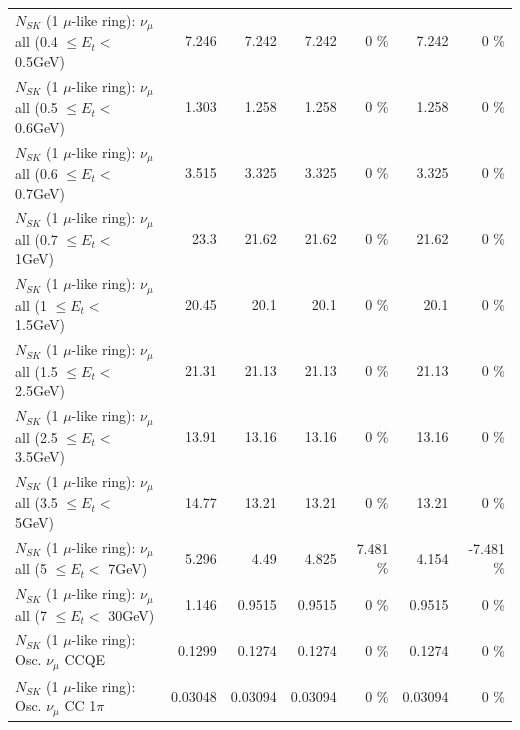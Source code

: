 \begin{table}
\begin{tabular}{| l | r | r | r  r | r  r |}
       $N_{SK}$ (1 $\mu$-like ring): $\nu_{\mu}$ all (0.4 $\leq E_{t} <$ 0.5GeV) &           7.246 &           7.242 &           7.242 &        0 \%  &           7.242 &        0 \%  \\ 
       $N_{SK}$ (1 $\mu$-like ring): $\nu_{\mu}$ all (0.5 $\leq E_{t} <$ 0.6GeV) &           1.303 &           1.258 &           1.258 &        0 \%  &           1.258 &        0 \%  \\ 
       $N_{SK}$ (1 $\mu$-like ring): $\nu_{\mu}$ all (0.6 $\leq E_{t} <$ 0.7GeV) &           3.515 &           3.325 &           3.325 &        0 \%  &           3.325 &        0 \%  \\ 
         $N_{SK}$ (1 $\mu$-like ring): $\nu_{\mu}$ all (0.7 $\leq E_{t} <$ 1GeV) &            23.3 &           21.62 &           21.62 &        0 \%  &           21.62 &        0 \%  \\ 
         $N_{SK}$ (1 $\mu$-like ring): $\nu_{\mu}$ all (1 $\leq E_{t} <$ 1.5GeV) &           20.45 &            20.1 &            20.1 &        0 \%  &            20.1 &        0 \%  \\ 
       $N_{SK}$ (1 $\mu$-like ring): $\nu_{\mu}$ all (1.5 $\leq E_{t} <$ 2.5GeV) &           21.31 &           21.13 &           21.13 &        0 \%  &           21.13 &        0 \%  \\ 
       $N_{SK}$ (1 $\mu$-like ring): $\nu_{\mu}$ all (2.5 $\leq E_{t} <$ 3.5GeV) &           13.91 &           13.16 &           13.16 &        0 \%  &           13.16 &        0 \%  \\ 
         $N_{SK}$ (1 $\mu$-like ring): $\nu_{\mu}$ all (3.5 $\leq E_{t} <$ 5GeV) &           14.77 &           13.21 &           13.21 &        0 \%  &           13.21 &        0 \%  \\ 
           $N_{SK}$ (1 $\mu$-like ring): $\nu_{\mu}$ all (5 $\leq E_{t} <$ 7GeV) &           5.296 &            4.49 &           4.825 &    7.481 \%  &           4.154 &   -7.481 \%  \\ 
          $N_{SK}$ (1 $\mu$-like ring): $\nu_{\mu}$ all (7 $\leq E_{t} <$ 30GeV) &           1.146 &          0.9515 &          0.9515 &        0 \%  &          0.9515 &        0 \%  \\ 
\hline
\hline
                               $N_{SK}$ (1 $\mu$-like ring): Osc. $\nu_\mu$ CCQE &          0.1299 &          0.1274 &          0.1274 &        0 \%  &          0.1274 &        0 \%  \\ 
                          $N_{SK}$ (1 $\mu$-like ring): Osc. $\nu_\mu$ CC 1$\pi$ &         0.03048 &         0.03094 &         0.03094 &        0 \%  &         0.03094 &        0 \%  \\ 

\end{tabular}
\end{table}
